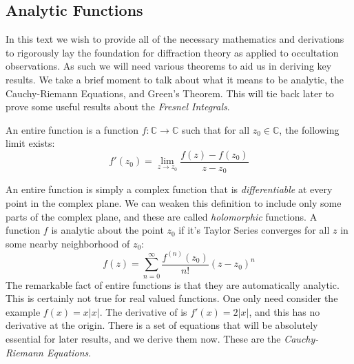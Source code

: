 \documentclass[crop=false,class=book,oneside]{standalone}
\begin{document}
        \subsection{Analytic Functions}
            In this text we wish to provide all of the necessary
            mathematics and derivations to rigorously lay the foundation
            for diffraction theory as applied to occultation
            observations. As such we will need various theorems
            to aid us in deriving key results. We take a brief
            moment to talk about what it means to be analytic,
            the Cauchy-Riemann Equations, and Green's Theorem.
            This will tie back later to prove some useful results about
            the \textit{Fresnel Integrals}.
            \begin{definition}
                An entire function is a function
                $f:\mathbb{C}\rightarrow\mathbb{C}$ such that
                for all $z_{0}\in\mathbb{C}$, the following limit
                exists:
                \begin{equation}
                    f'(z_{0})=\underset{z\rightarrow{z_{0}}}{\lim}
                    \frac{f(z)-f(z_{0})}{z-z_{0}}
                \end{equation}
            \end{definition}
            An entire function is simply a complex function that
            is \textit{differentiable} at every point in the
            complex plane. We can weaken this definition to include
            only some parts of the complex plane, and these are
            called \textit{holomorphic} functions.
            A function $f$ is analytic about the point $z_{0}$
            if it's Taylor Series converges for all $z$ in some
            nearby neighborhood of $z_{0}$:
            \begin{equation}
                f(z)=\sum_{n=0}^{\infty}\frac{f^{(n)}(z_{0})}{n!}
                (z-z_{0})^{n}
            \end{equation}
            The remarkable fact of entire functions
            is that they are automatically analytic.
            This is certainly not true for real valued functions.
            One only need consider the example
            $f(x)=x|x|$. The derivative of is
            $f'(x)=2|x|$, and this has no derivative at the
            origin. There is a set of equations that will be
            absolutely essential for later results, and we derive
            them now. These are the
            \textit{Cauchy-Riemann Equations}.
\end{document}
